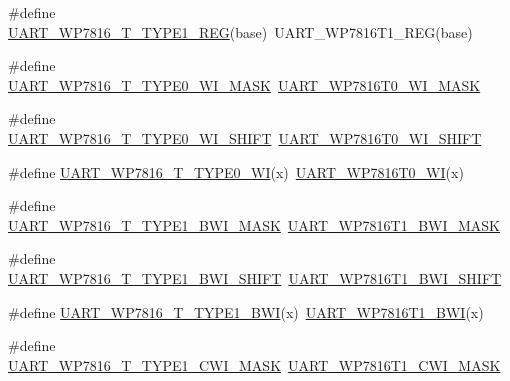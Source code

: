 \begin{DoxyCompactItemize}
\item 
\#define \mbox{\hyperlink{group___s_d_k___compatibility___symbols_ga5b2fc81c8b3403186dcbdd324f517246}{U\+A\+R\+T\+\_\+\+W\+P7816\+\_\+\+T\+\_\+\+T\+Y\+P\+E1\+\_\+\+R\+EG}}(base)~U\+A\+R\+T\+\_\+\+W\+P7816\+T1\+\_\+\+R\+EG(base)
\item 
\#define \mbox{\hyperlink{group___s_d_k___compatibility___symbols_ga286b20da1c2d027adb43e13a29d0148b}{U\+A\+R\+T\+\_\+\+W\+P7816\+\_\+\+T\+\_\+\+T\+Y\+P\+E0\+\_\+\+W\+I\+\_\+\+M\+A\+SK}}~\mbox{\hyperlink{group___u_a_r_t___register___masks_ga0a582c1c952e184c6d89be1827e3c131}{U\+A\+R\+T\+\_\+\+W\+P7816\+T0\+\_\+\+W\+I\+\_\+\+M\+A\+SK}}
\item 
\#define \mbox{\hyperlink{group___s_d_k___compatibility___symbols_ga2abd3cac45b65c8608d7acb2c985f56e}{U\+A\+R\+T\+\_\+\+W\+P7816\+\_\+\+T\+\_\+\+T\+Y\+P\+E0\+\_\+\+W\+I\+\_\+\+S\+H\+I\+FT}}~\mbox{\hyperlink{group___u_a_r_t___register___masks_gad25ad450ca4c9d163a598ad6781ac8d8}{U\+A\+R\+T\+\_\+\+W\+P7816\+T0\+\_\+\+W\+I\+\_\+\+S\+H\+I\+FT}}
\item 
\#define \mbox{\hyperlink{group___s_d_k___compatibility___symbols_ga1d1dbaccc030f4bb7c78161c422cfd6c}{U\+A\+R\+T\+\_\+\+W\+P7816\+\_\+\+T\+\_\+\+T\+Y\+P\+E0\+\_\+\+WI}}(x)~\mbox{\hyperlink{group___u_a_r_t___register___masks_ga33967ac259eadac40473fea10ec68f12}{U\+A\+R\+T\+\_\+\+W\+P7816\+T0\+\_\+\+WI}}(x)
\item 
\#define \mbox{\hyperlink{group___s_d_k___compatibility___symbols_gadb34493e13585c4acf5c3fba81e0e03f}{U\+A\+R\+T\+\_\+\+W\+P7816\+\_\+\+T\+\_\+\+T\+Y\+P\+E1\+\_\+\+B\+W\+I\+\_\+\+M\+A\+SK}}~\mbox{\hyperlink{group___u_a_r_t___register___masks_ga9b252b9dd4381388279f30adc107d715}{U\+A\+R\+T\+\_\+\+W\+P7816\+T1\+\_\+\+B\+W\+I\+\_\+\+M\+A\+SK}}
\item 
\#define \mbox{\hyperlink{group___s_d_k___compatibility___symbols_ga23a788a5415cebd78a364d0578ee9b7c}{U\+A\+R\+T\+\_\+\+W\+P7816\+\_\+\+T\+\_\+\+T\+Y\+P\+E1\+\_\+\+B\+W\+I\+\_\+\+S\+H\+I\+FT}}~\mbox{\hyperlink{group___u_a_r_t___register___masks_ga111a16bd25727769c150f337dfbb8da1}{U\+A\+R\+T\+\_\+\+W\+P7816\+T1\+\_\+\+B\+W\+I\+\_\+\+S\+H\+I\+FT}}
\item 
\#define \mbox{\hyperlink{group___s_d_k___compatibility___symbols_ga494a1fd499433faa3dc6301dc82f2106}{U\+A\+R\+T\+\_\+\+W\+P7816\+\_\+\+T\+\_\+\+T\+Y\+P\+E1\+\_\+\+B\+WI}}(x)~\mbox{\hyperlink{group___u_a_r_t___register___masks_gaf716107ac91a9a5bc9a1367bf6bfe9a6}{U\+A\+R\+T\+\_\+\+W\+P7816\+T1\+\_\+\+B\+WI}}(x)
\item 
\#define \mbox{\hyperlink{group___s_d_k___compatibility___symbols_gac187226c5d0a1c13888f04cb6fd837b1}{U\+A\+R\+T\+\_\+\+W\+P7816\+\_\+\+T\+\_\+\+T\+Y\+P\+E1\+\_\+\+C\+W\+I\+\_\+\+M\+A\+SK}}~\mbox{\hyperlink{group___u_a_r_t___register___masks_ga95c5796ae8b5d1bf0db4dcd07801eb16}{U\+A\+R\+T\+\_\+\+W\+P7816\+T1\+\_\+\+C\+W\+I\+\_\+\+M\+A\+SK}}

\end{DoxyCompactItemize}
